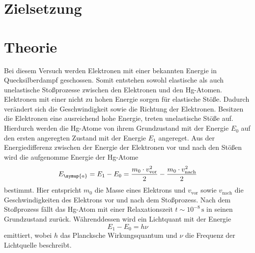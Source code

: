 \nocite{anleitungV601}
\section{Zielsetzung}
\label{sec:Zielsetzung}


\section{Theorie}
\label{sec:Theorie}
Bei diesem Versuch werden Elektronen mit einer bekannten Energie in Quecksilberdampf geschossen. Somit entstehen sowohl elastische als auch unelastische
Stoßprozesse zwischen den Elektronen und den Hg-Atomen. Elektronen mit einer nicht zu hohen Energie sorgen für elastische Stöße. Dadurch verändert sich die
Geschwindigkeit sowie die Richtung der Elektronen. Besitzen die Elektronen eine ausreichend hohe Energie, treten unelastische Stöße auf. Hierdurch werden die Hg-Atome
von ihrem Grundzustand mit der Energie $E_0$ auf den ersten angeregten Zustand mit der Energie $E_1$ angereget. Aus der Energiedifferenz zwischen der Energie der Elektronen 
vor und nach den Stößen wird die aufgenomme Energie der Hg-Atome
\begin{equation}
    E_{\symup{a}}=E_1 - E_0 =\frac{m_0\cdot v_{\text{vor}}^2}{2} - \frac{m_0\cdot v_{\text{nach}}^2}{2}
    \label{eqn:Energiedifferenz}
\end{equation}
bestimmt. Hier entspricht $m_0$ die Masse eines Elektrons und $v_{\text{vor}}$ sowie $v_{\text{nach}}$ die Geschwindigkeiten des Elektrons vor und nach dem Stoßprozess.
Nach dem Stoßprozess fällt das Hg-Atom mit einer Relaxationszeit $t \sim 10^{-8}\,\unit{\second}$ in seinen Grundzustand zurück. Währenddessen wird ein Lichtquant
mit der Energie 
\begin{equation}
  E_1 - E_0 = h \nu
  \label{eqn:EnergieLichtquants}
\end{equation}
emittiert, wobei $h$ das Plancksche Wirkungsquantum und $\nu$ die Frequenz der Lichtquelle beschreibt.
